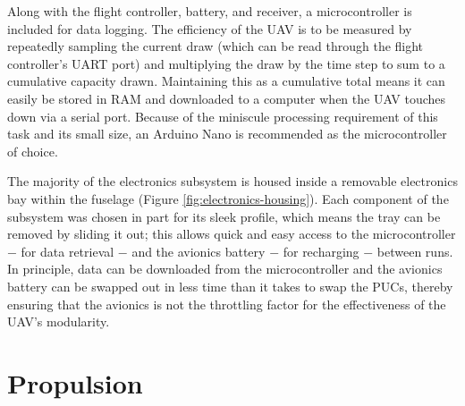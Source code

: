 \documentclass[../../main.tex]{subfiles}
\begin{document}
Along with the flight controller, battery, and receiver, a microcontroller is included for data logging.
The efficiency of the UAV is to be measured by repeatedly sampling the current draw (which can be read through the flight controller's UART port) and multiplying the draw by the time step to sum to a cumulative capacity drawn.
Maintaining this as a cumulative total means it can easily be stored in RAM and downloaded to a computer when the UAV touches down via a serial port.
Because of the miniscule processing requirement of this task and its small size, an Arduino Nano is recommended as the microcontroller of choice.



%    

The majority of the electronics subsystem is housed inside a removable electronics bay within the fuselage (Figure \ref{fig:electronics-housing}).
Each component of the subsystem was chosen in part for its sleek profile, which means the tray can be removed by sliding it out; this allows quick and easy access to the microcontroller $-$ for data retrieval $-$ and the avionics battery $-$ for recharging $-$ between runs.
In principle, data can be downloaded from the microcontroller and the avionics battery can be swapped out in less time than it takes to swap the PUCs, thereby ensuring that the avionics is not the throttling factor for the effectiveness of the UAV's modularity.

\section{Propulsion} \label{sec:final-design-proposal:propulsion}
\end{document}
